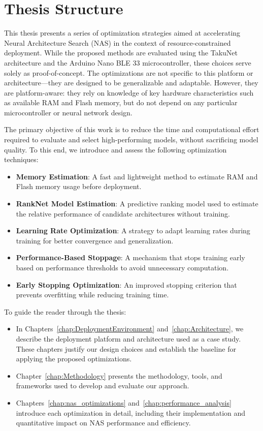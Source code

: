 \chapter{Thesis Structure}
\label{chap:ThesisStructure}

This thesis presents a series of optimization strategies aimed at accelerating Neural Architecture Search (NAS) in the context of resource-constrained deployment. While the proposed methods are evaluated using the TakuNet architecture and the Arduino Nano BLE 33 microcontroller, these choices serve solely as proof-of-concept. The optimizations are not specific to this platform or architecture—they are designed to be generalizable and adaptable. However, they are platform-aware: they rely on knowledge of key hardware characteristics such as available RAM and Flash memory, but do not depend on any particular microcontroller or neural network design.

The primary objective of this work is to reduce the time and computational effort required to evaluate and select high-performing models, without sacrificing model quality. To this end, we introduce and assess the following optimization techniques:


\begin{itemize}
    \item \textbf{Memory Estimation}: A fast and lightweight method to estimate RAM and Flash memory usage before deployment.
    \item \textbf{RankNet Model Estimation}: A predictive ranking model used to estimate the relative performance of candidate architectures without training.
    \item \textbf{Learning Rate Optimization}: A strategy to adapt learning rates during training for better convergence and generalization.
    \item \textbf{Performance-Based Stoppage}: A mechanism that stops training early based on performance thresholds to avoid unnecessary computation.
    \item \textbf{Early Stopping Optimization}: An improved stopping criterion that prevents overfitting while reducing training time.
\end{itemize}

To guide the reader through the thesis:

\begin{itemize}
    \item In Chapters~\ref{chap:DeploymentEnvironment} and~\ref{chap:Architecture}, we describe the deployment platform and architecture used as a case study. These chapters justify our design choices and establish the baseline for applying the proposed optimizations.
    
    \item Chapter~\ref{chap:Methodology} presents the methodology, tools, and frameworks used to develop and evaluate our approach.
    
    \item Chapters~\ref{chap:nas_optimizations} and~\ref{chap:performance_analysis} introduce each optimization in detail, including their implementation and quantitative impact on NAS performance and efficiency.
\end{itemize}

